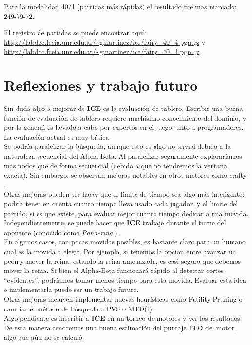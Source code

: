 \documentclass{article}
\newcommand{\ICE}[0]{{\bf ICE}}
\begin{document}
\begin{multicols}{2}
Para la modalidad 40/1 (partidas más rápidas) el resultado fue mas
marcado: 249-79-72.

El registro de partidas se puede encontrar aquí:
\url{http://labdcc.fceia.unr.edu.ar/~gmartinez/ice/fairy\_40\_4.pgn.gz}
y
\url{http://labdcc.fceia.unr.edu.ar/~gmartinez/ice/fairy\_40\_1.pgn.gz}

\section{Reflexiones y trabajo futuro}
Sin duda algo a mejorar de \ICE{} es la evaluación de tablero. Escribir
una buena función de evaluación de tablero requiere muchísimo
conocimiento del dominio, y por lo general es llevado a cabo por
expertos en el juego junto a programadores. La evaluación actual es muy
básica.
\\

Se podría paralelizar la búsqueda\cite{parallel-ab}, aunque esto
es algo no trivial debido a la naturaleza secuencial del Alpha-Beta.
Al paralelizar seguramente exploraríamos más nodos que de forma
secuencial (debido a que no tendremos la ventana exacta), Sin embargo,
se observan mejoras notables en otros motores como crafty \cite{crafty}
\cite{crafty-threads}.
\\

Otras mejoras pueden ser hacer que el límite de tiempo sea algo más
inteligente: podría tener en cuenta cuanto tiempo lleva usado cada
jugador, y el límite del partido, si es que existe, para evaluar
mejor cuanto tiempo dedicar a una movida. Independientemente, se puede
hacer que \ICE{} trabaje durante el turno del oponente (conocido como
\emph{Pondering}\cite{pondering} \cite{wiki:pondering}).
\\

En algunos casos, con pocas movidas posibles, es bastante claro para un
humano cual es la movida a elegir. Por ejemplo, si tenemos la opción
entre avanzar un peón y mover la reina, estando la reina amenazada,
es casi seguro que debemos mover la reina. Si bien el Alpha-Beta
funcionará rápido al detectar cortes ``evidentes'', podríamos tomar
menos tiempo para esta movida. Evaluar esta idea e implementarla puede
ser un trabajo futuro.
\\

Otras mejoras incluyen implementar nuevas heurísticas como Futility
Pruning o cambiar el método de búsqueda a PVS o MTD(f).
\\

Algo pendiente es inscribir a \ICE{} en un torneo de motores y ver los
resultados. De esta manera tendremos una buena estimación del puntaje
ELO del motor, algo que aún no se calculó.




\end{multicols}
\end{document}
